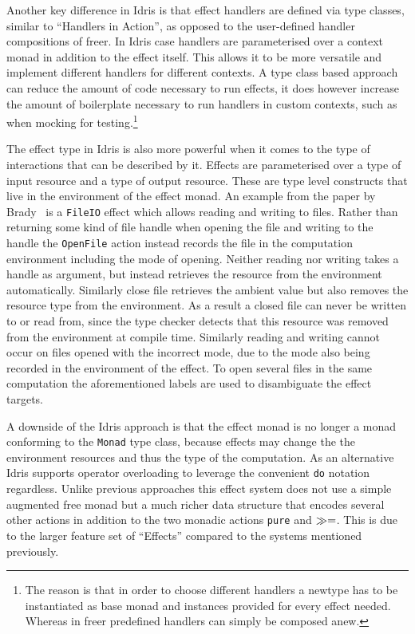Another key difference in Idris is that effect handlers are defined via type
classes, similar to ``Handlers in Action'', as opposed to the user-defined
handler compositions of freer. In Idris case handlers are parameterised over a
context monad in addition to the effect itself. This allows it to be more
versatile and implement different handlers for different contexts. A type class
based approach can reduce the amount of code necessary to run effects, it does
however increase the amount of boilerplate necessary to run handlers in custom
contexts, such as when mocking for testing.\footnote{The reason is that in order
  to choose different handlers a newtype has to be instantiated as base monad
  and instances provided for every effect needed. Whereas in freer predefined
  handlers can simply be composed anew.}

The effect type in Idris is also more powerful when it comes to the type of
interactions that can be described by it. Effects are parameterised over a type
of input resource and a type of output resource. These are type level constructs
that live in the environment of the effect monad. An example from the paper by
Brady~\cite{algebraic-effects-idris} is a \texttt{FileIO} effect which allows
reading and writing to files. Rather than returning some kind of file handle
when opening the file and writing to the handle the \texttt{OpenFile} action
instead records the file in the computation environment including the mode of
opening. Neither reading nor writing takes a handle as argument, but instead
retrieves the resource from the environment automatically. Similarly close file
retrieves the ambient value but also removes the resource type from the
environment. As a result a closed file can never be written to or read from,
since the type checker detects that this resource was removed from the
environment at compile time. Similarly reading and writing cannot occur on files
opened with the incorrect mode, due to the mode also being recorded in the
environment of the effect. To open several files in the same computation the
aforementioned labels are used to disambiguate the effect targets.

A downside of the Idris approach is that the effect monad is no longer a monad
conforming to the \texttt{Monad} type class, because effects may change the the
environment resources and thus the type of the computation. As an alternative
Idris supports operator overloading to leverage the convenient \texttt{do}
notation regardless. Unlike previous approaches this effect system does not use
a simple augmented free monad but a much richer data structure that encodes
several other actions in addition to the two monadic actions \texttt{pure} and
$\gg=$. This is due to the larger feature set of ``Effects'' compared to the
systems mentioned previously.

